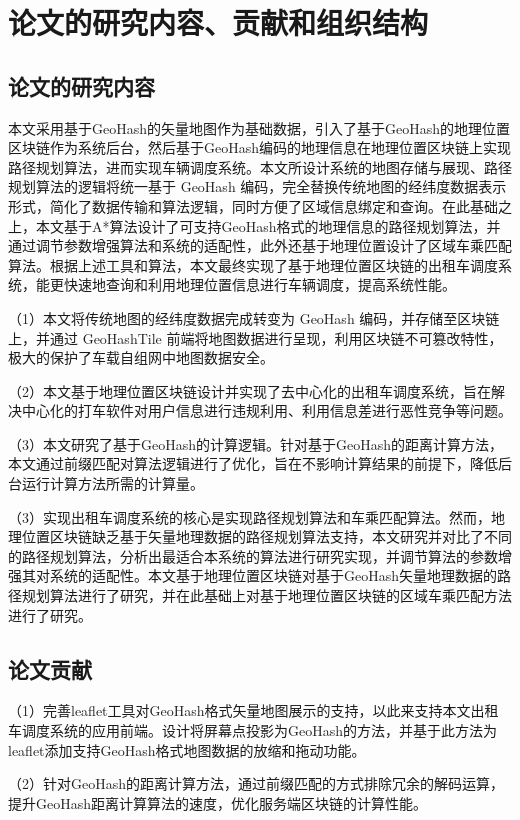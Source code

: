 \section{论文的研究内容、贡献和组织结构}
\subsection{论文的研究内容}

本文采用基于GeoHash的矢量地图作为基础数据，引入了基于GeoHash的地理位置区块链作为系统后台，然后基于GeoHash编码的地理信息在地理位置区块链上实现路径规划算法，进而实现车辆调度系统。本文所设计系统的地图存储与展现、路径规划算法的逻辑将统一基于 GeoHash 编码，完全替换传统地图的经纬度数据表示形式，简化了数据传输和算法逻辑，同时方便了区域信息绑定和查询。在此基础之上，本文基于A*算法设计了可支持GeoHash格式的地理信息的路径规划算法，并通过调节参数增强算法和系统的适配性，此外还基于地理位置设计了区域车乘匹配算法。根据上述工具和算法，本文最终实现了基于地理位置区块链的出租车调度系统，能更快速地查询和利用地理位置信息进行车辆调度，提高系统性能。

（1）本文将传统地图的经纬度数据完成转变为 GeoHash 编码，并存储至区块链上，并通过 GeoHashTile 前端将地图数据进行呈现，利用区块链不可篡改特性，极大的保护了车载自组网中地图数据安全。

（2）本文基于地理位置区块链设计并实现了去中心化的出租车调度系统，旨在解决中心化的打车软件对用户信息进行违规利用、利用信息差进行恶性竞争等问题。

（3）本文研究了基于GeoHash的计算逻辑。针对基于GeoHash的距离计算方法，本文通过前缀匹配对算法逻辑进行了优化，旨在不影响计算结果的前提下，降低后台运行计算方法所需的计算量。

（3）实现出租车调度系统的核心是实现路径规划算法和车乘匹配算法。然而，地理位置区块链缺乏基于矢量地理数据的路径规划算法支持，本文研究并对比了不同的路径规划算法，分析出最适合本系统的算法进行研究实现，并调节算法的参数增强其对系统的适配性。本文基于地理位置区块链对基于GeoHash矢量地理数据的路径规划算法进行了研究，并在此基础上对基于地理位置区块链的区域车乘匹配方法进行了研究。

\subsection{论文贡献}
（1）完善leaflet工具对GeoHash格式矢量地图展示的支持，以此来支持本文出租车调度系统的应用前端。设计将屏幕点投影为GeoHash的方法，并基于此方法为leaflet添加支持GeoHash格式地图数据的放缩和拖动功能。

（2）针对GeoHash的距离计算方法，通过前缀匹配的方式排除冗余的解码运算，提升GeoHash距离计算算法的速度，优化服务端区块链的计算性能。

